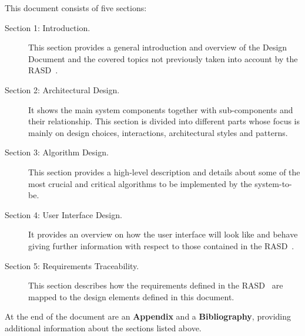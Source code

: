 This document consists of five sections:

\begin{description}
\item[Section 1: Introduction.] This section provides a general introduction and overview of the Design Document and the covered topics not previously taken into account by the RASD~\cite{rasd}.
\item[Section 2: Architectural Design.] It shows the main system components together with sub-components and their relationship. This section is divided into different parts whose focus is mainly on design choices, interactions, architectural styles and patterns.
\item[Section 3: Algorithm Design.] This section provides a high-level description and details about some of the most crucial and critical algorithms to be implemented by the system-to-be.
\item[Section 4: User Interface Design.] It provides an overview on how the user interface will look like and behave giving further information with respect to those contained in the RASD~\cite{rasd}.
\item[Section 5: Requirements Traceability.] This section describes how the requirements defined in the RASD~\cite{rasd} are mapped to the design elements defined in this document.
\end{description}
At the end of the document are an \textbf{Appendix} and a \textbf{Bibliography}, providing additional information about the sections listed above.